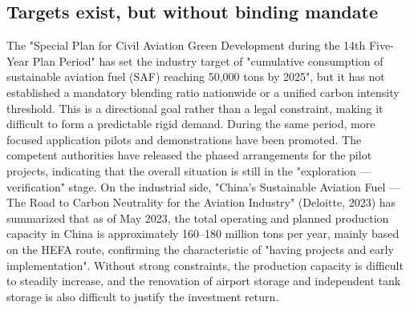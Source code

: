 \documentclass[a4paper,11pt]{article}
\begin{document}
\subsection{Targets exist, but without binding mandate}
The "Special Plan for Civil Aviation Green Development during the 14th Five-Year Plan Period" has set the industry target of "cumulative consumption of sustainable aviation fuel (SAF) reaching 50,000 tons by 2025", but it has not established a mandatory blending ratio nationwide or a unified carbon intensity threshold. This is a directional goal rather than a legal constraint, making it difficult to form a predictable rigid demand. During the same period, more focused application pilots and demonstrations have been promoted. The competent authorities have released the phased arrangements for the pilot projects, indicating that the overall situation is still in the "exploration --- verification" stage. On the industrial side, "China's Sustainable Aviation Fuel --- The Road to Carbon Neutrality for the Aviation Industry" (Deloitte, 2023) has summarized that as of May 2023, the total operating and planned production capacity in China is approximately 160--180 million tons per year, mainly based on the HEFA route, confirming the characteristic of "having projects and early implementation". Without strong constraints, the production capacity is difficult to steadily increase, and the renovation of airport storage and independent tank storage is also difficult to justify the investment return.
\end{document}
